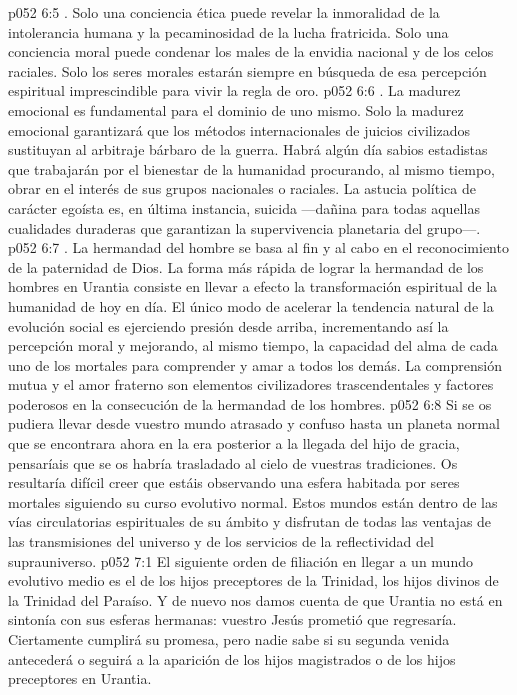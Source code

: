 \vs p052 6:5 . Solo una conciencia ética puede revelar la inmoralidad de la intolerancia humana y la pecaminosidad de la lucha fratricida. Solo una conciencia moral puede condenar los males de la envidia nacional y de los celos raciales. Solo los seres morales estarán siempre en búsqueda de esa percepción espiritual imprescindible para vivir la regla de oro.
\vs p052 6:6 . La madurez emocional es fundamental para el dominio de uno mismo. Solo la madurez emocional garantizará que los métodos internacionales de juicios civilizados sustituyan al arbitraje bárbaro de la guerra. Habrá algún día sabios estadistas que trabajarán por el bienestar de la humanidad procurando, al mismo tiempo, obrar en el interés de sus grupos nacionales o raciales. La astucia política de carácter egoísta es, en última instancia, suicida ---dañina para todas aquellas cualidades duraderas que garantizan la supervivencia planetaria del grupo---.
\vs p052 6:7 . La hermandad del hombre se basa al fin y al cabo en el reconocimiento de la paternidad de Dios. La forma más rápida de lograr la hermandad de los hombres en Urantia consiste en llevar a efecto la transformación espiritual de la humanidad de hoy en día. El único modo de acelerar la tendencia natural de la evolución social es ejerciendo presión desde arriba, incrementando así la percepción moral y mejorando, al mismo tiempo, la capacidad del alma de cada uno de los mortales para comprender y amar a todos los demás. La comprensión mutua y el amor fraterno son elementos civilizadores trascendentales y factores poderosos en la consecución de la hermandad de los hombres.
\vs p052 6:8 \pc Si se os pudiera llevar desde vuestro mundo atrasado y confuso hasta un planeta normal que se encontrara ahora en la era posterior a la llegada del hijo de gracia, pensaríais que se os habría trasladado al cielo de vuestras tradiciones. Os resultaría difícil creer que estáis observando una esfera habitada por seres mortales siguiendo su curso evolutivo normal. Estos mundos están dentro de las vías circulatorias espirituales de su ámbito y disfrutan de todas las ventajas de las transmisiones del universo y de los servicios de la reflectividad del suprauniverso.
\vs p052 7:1 El siguiente orden de filiación en llegar a un mundo evolutivo medio es el de los hijos preceptores de la Trinidad, los hijos divinos de la Trinidad del Paraíso. Y de nuevo nos damos cuenta de que Urantia no está en sintonía con sus esferas hermanas: vuestro Jesús prometió que regresaría. Ciertamente cumplirá su promesa, pero nadie sabe si su segunda venida antecederá o seguirá a la aparición de los hijos magistrados o de los hijos preceptores en Urantia.
